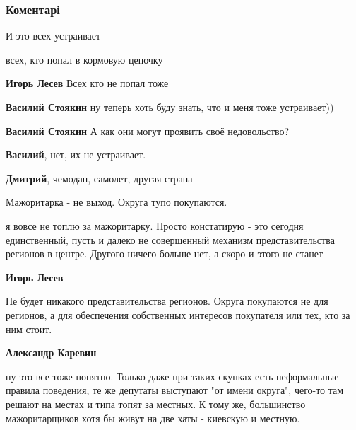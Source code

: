  
 
 
 
 
\subsubsection{Коментарі}

\begin{itemize} %
И это всех устраивает

\begin{itemize} %
всех, кто попал в кормовую цепочку

\textbf{Игорь Лесев} Всех кто не попал тоже

\textbf{Василий Стоякин} ну теперь хоть буду знать, что и меня тоже устраивает))

\textbf{Василий Стоякин} А как они могут проявить своё недовольство?

\textbf{Василий}, нет, их не устраивает.

\textbf{Дмитрий}, чемодан, самолет, другая страна
\end{itemize} %

Мажоритарка - не выход. Округа тупо покупаются.

\begin{itemize} %

я вовсе не топлю за мажоритарку. Просто констатирую - это сегодня единственный,
пусть и далеко не совершенный механизм представительства регионов в центре.
Другого ничего больше нет, а скоро и этого не станет

\textbf{Игорь Лесев} 

Не будет никакого представительства регионов. Округа покупаются не для
регионов, а для обеспечения собственных интересов покупателя или тех, кто за
ним стоит.

\textbf{Александр Каревин} 

ну это все тоже понятно. Только даже при таких скупках есть неформальные
правила поведения, те же депутаты выступают "от имени округа", чего-то там
решают на местах и типа топят за местных. К тому же, большинство мажоритарщиков
хотя бы живут на две хаты - киевскую и местную.


\end{itemize}
\end{itemize}
